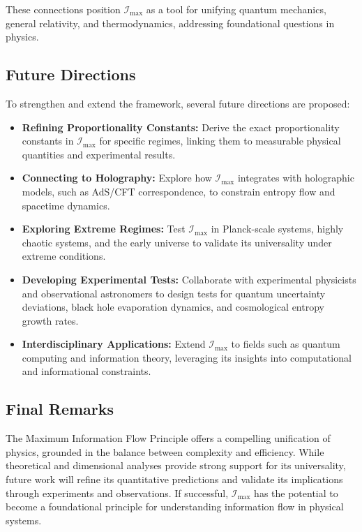 \documentclass[12pt]{article}
\begin{document}
These connections position \( \mathcal{I}_{\text{max}} \) as a tool for unifying quantum mechanics, general relativity, and thermodynamics, addressing foundational questions in physics.

\subsection{Future Directions}
To strengthen and extend the framework, several future directions are proposed:
\begin{itemize}
    \item \textbf{Refining Proportionality Constants:} Derive the exact proportionality constants in \( \mathcal{I}_{\text{max}} \) for specific regimes, linking them to measurable physical quantities and experimental results.
    \item \textbf{Connecting to Holography:} Explore how \( \mathcal{I}_{\text{max}} \) integrates with holographic models, such as AdS/CFT correspondence, to constrain entropy flow and spacetime dynamics.
    \item \textbf{Exploring Extreme Regimes:} Test \( \mathcal{I}_{\text{max}} \) in Planck-scale systems, highly chaotic systems, and the early universe to validate its universality under extreme conditions.
    \item \textbf{Developing Experimental Tests:} Collaborate with experimental physicists and observational astronomers to design tests for quantum uncertainty deviations, black hole evaporation dynamics, and cosmological entropy growth rates.
    \item \textbf{Interdisciplinary Applications:} Extend \( \mathcal{I}_{\text{max}} \) to fields such as quantum computing and information theory, leveraging its insights into computational and informational constraints.
\end{itemize}

\subsection{Final Remarks}
The Maximum Information Flow Principle offers a compelling unification of physics, grounded in the balance between complexity and efficiency. While theoretical and dimensional analyses provide strong support for its universality, future work will refine its quantitative predictions and validate its implications through experiments and observations. If successful, \( \mathcal{I}_{\text{max}} \) has the potential to become a foundational principle for understanding information flow in physical systems.
\end{document}
